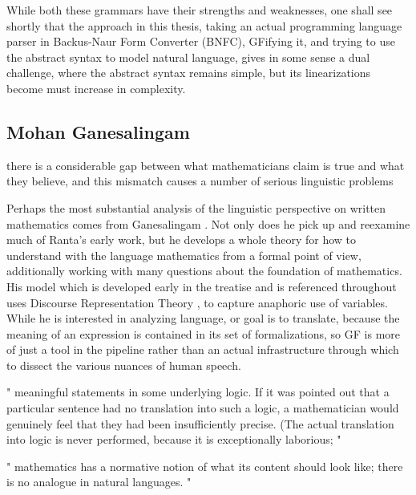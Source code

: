 While both these grammars have their strengths and weaknesses, one shall see
shortly that the approach in this thesis, taking an actual programming language
parser in Backus-Naur Form Converter (BNFC), GFifying it, and trying to use the
abstract syntax to model natural language, gives in some sense a dual challenge,
where the abstract syntax remains simple, but its linearizations become
must increase in complexity.


\subsection{Mohan Ganesalingam}


\begin{displayquote}

there is a considerable gap between what mathematicians claim is true and what
they believe, and this mismatch causes a number of serious linguistic problems

\end{displayquote}

Perhaps the most substantial analysis of the linguistic perspective on
written mathematics comes from Ganesalingam \cite{ganesalingam2013language}.
Not only does he pick up and reexamine much of Ranta's early work, but he
develops a whole theory for how to understand with the language mathematics from
a formal point of view, additionally working with many questions about the
foundation of mathematics. His model which is developed early in the treatise
and is referenced 
throughout uses Discourse Representation Theory \cite{kamp2011discourse}, to
capture anaphoric use of variables. While he is interested in analyzing
language, or goal is to translate, because the meaning of an expression is
contained in its set of formalizations, so GF is more of just a tool in the
pipeline rather than an actual infrastructure through which to dissect the various
nuances of human speech.


"
meaningful statements in some underlying logic. If it was pointed out that
a particular sentence had no translation into such a logic, a mathematician
would genuinely feel that they had been insufficiently precise. (The actual
translation into logic is never performed, because it is exceptionally laborious;
"

"
mathematics has a normative notion of what its content should look like; there is no
analogue in natural languages.
"


